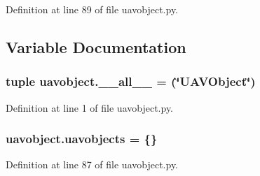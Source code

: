 Definition at line 89 of file uavobject.\-py.



\subsection{Variable Documentation}
\hypertarget{namespaceuavobject_a2ded06a5cc80e6cb4a7af561713e3b13}{
\subsubsection[{\-\_\-\-\_\-all\-\_\-\-\_\-}]{\setlength{\rightskip}{0pt plus 5cm}tuple uavobject.\-\_\-\-\_\-all\-\_\-\-\_\- = (\char`\"{}U\-A\-V\-Object\char`\"{})}}\label{namespaceuavobject_a2ded06a5cc80e6cb4a7af561713e3b13}


Definition at line 1 of file uavobject.\-py.

\hypertarget{namespaceuavobject_aa0be71162e751d360dfa303427e45c72}{
\subsubsection[{uavobjects}]{ uavobject.\-uavobjects = \{\}}}\label{namespaceuavobject_aa0be71162e751d360dfa303427e45c72}


Definition at line 87 of file uavobject.\-py.


